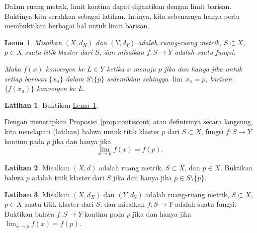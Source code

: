 \documentclass[12pt,openany]{book}
\theoremstyle{plain}
\newtheorem{lemma}[thm]{Lema}
\theoremstyle{remark}
\theoremstyle{definition}
\newenvironment{exbox}{%
    \def\FrameCommand{\vrule width 1pt \relax\hspace{10pt}}%
    \MakeFramed{\advance\hsize-\width\FrameRestore}%
}{%
    \endMakeFramed
}
\theoremstyle{exercise}
\newtheorem{exercise}{Latihan}[section]
\theoremstyle{example}
\newcommand{\propref}[1]{\hyperref[#1]{Proposisi~\ref*{#1}}}
\newcommand{\lemmaref}[1]{\hyperref[#1]{Lema~\ref*{#1}}}
\begin{document}
Dalam ruang metrik, limit kontinu dapat digantikan dengan limit barisan.
Buktinya kita serahkan sebagai latihan.
Intinya, kita sebenarnya hanya perlu membuktikan berbagai hal untuk limit barisan.

\begin{lemma}\label{ms:seqflimit:lemma}
Misalkan $(X,d_X)$ dan $(Y,d_Y)$ adalah ruang-ruang metrik, $S \subset X$, $p \in X$
suatu titik klaster dari $S$, dan misalkan $f \colon S \to Y$ adalah suatu fungsi.

Maka
$f(x)$ konvergen ke $L \in Y$ ketika $x$ menuju $p$ jika dan hanya jika untuk setiap barisan $\{ x_n \}$
dalam $S \setminus \{p\}$
sedemikian sehingga $\lim\, x_n = p$,
barisan $\bigl\{ f(x_n) \bigr\}$ konvergen ke $L$.
\end{lemma}

\begin{exbox}
\begin{exercise}
Buktikan \lemmaref{ms:seqflimit:lemma}.
\end{exercise}
\end{exbox}

Dengan menerapkan \propref{prop:contiscont} atau definisinya secara langsung, kita mendapati
(latihan) bahwa untuk titik klaster $p$ dari $S
\subset X$, fungsi
$f \colon S \to Y$ kontinu pada $p$ jika dan hanya jika
\begin{equation*}
\lim_{x \to p} f(x) = f(p) .
\end{equation*}

\begin{exbox}
\begin{exercise}
Misalkan $(X,d)$ adalah ruang metrik, $S \subset X$, dan $p \in X$.  Buktikan bahwa
$p$ adalah titik klaster dari $S$ jika dan hanya jika $p \in \overline{S \setminus \{
p \}}$.
\end{exercise}

\begin{exercise}
Misalkan $(X,d_X)$ dan $(Y,d_Y)$ adalah ruang-ruang metrik, $S \subset X$, $p \in X$
suatu titik klaster dari $S$, dan misalkan $f \colon S \to Y$ adalah suatu fungsi.
Buktikan bahwa
$f \colon S \to Y$ kontinu pada $p$ jika dan hanya jika
$\lim_{x \to p} f(x) = f(p)$.
\end{exercise}
\end{exbox}

\end{document}
